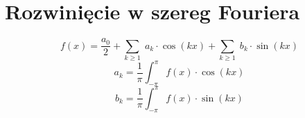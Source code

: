 \section{Rozwinięcie w szereg Fouriera}
\[
	f(x) = \frac{a_0}{2} + \sum_{k \geq 1}\; a_k \cdot \cos(kx) + \sum_{k \geq 1}\; b_k \cdot \sin(kx)
\]
\[
	a_k = \frac{1}{\pi} \int_{-\pi}^{\pi} f(x)\cdot\cos(kx)
\]
\[
	b_k = \frac{1}{\pi} \int_{-\pi}^{\pi} f(x)\cdot\sin(kx)
\]
